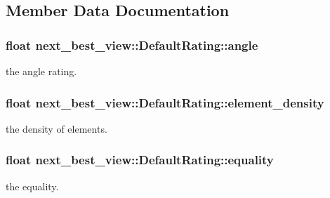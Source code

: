 \subsection{\-Member \-Data \-Documentation}
\hypertarget{structnext__best__view_1_1DefaultRating_a7f476b7b6786c5363cfa96f9a8b717c7}{
\subsubsection[{angle}]{\setlength{\rightskip}{0pt plus 5cm}float {\bf next\-\_\-best\-\_\-view\-::\-Default\-Rating\-::angle}}}\label{structnext__best__view_1_1DefaultRating_a7f476b7b6786c5363cfa96f9a8b717c7}


the angle rating. 

\hypertarget{structnext__best__view_1_1DefaultRating_adca56e4ed72fb20431dd06450766bfdd}{
\subsubsection[{element\-\_\-density}]{\setlength{\rightskip}{0pt plus 5cm}float {\bf next\-\_\-best\-\_\-view\-::\-Default\-Rating\-::element\-\_\-density}}}\label{structnext__best__view_1_1DefaultRating_adca56e4ed72fb20431dd06450766bfdd}


the density of elements. 

\hypertarget{structnext__best__view_1_1DefaultRating_a7e21af06d8a9897fb8420c4cdf27241e}{
\subsubsection[{equality}]{\setlength{\rightskip}{0pt plus 5cm}float {\bf next\-\_\-best\-\_\-view\-::\-Default\-Rating\-::equality}}}\label{structnext__best__view_1_1DefaultRating_a7e21af06d8a9897fb8420c4cdf27241e}


the equality. 

